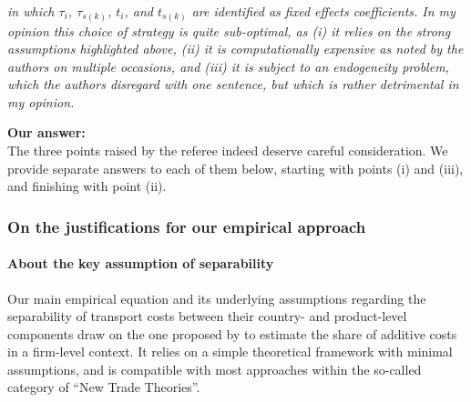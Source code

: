 \documentclass[a4paper,12pt]{article}
\begin{document}
\textit{in which $\tau_i$, $\tau_{s(k)}$, $t_i$, and $t_{s(k)}$ are identified as fixed effects coefficients.
In my opinion this choice of strategy is quite sub-optimal, as (i) it relies on
the strong assumptions highlighted above, (ii) it is computationally expensive
as noted by the authors on multiple occasions, and (iii) it is subject to an
endogeneity problem, which the authors disregard with one sentence, but which
is rather detrimental in my opinion.}

\textbf{Our answer:}\\



The three points raised by the referee indeed deserve careful consideration. We provide separate answers to each of them below, starting with points (i) and (iii), and finishing with point (ii).

\subsubsection{On the justifications for our empirical approach}

\paragraph{About the key assumption of separability}
Our main empirical equation and its underlying assumptions regarding the separability of transport costs between their country- and product-level components draw on the one proposed by \citet{Irrazabal_2015} to estimate the share of additive costs in a firm-level context. It relies on a simple theoretical framework with minimal assumptions, and is compatible with most approaches within the so-called category of ``New Trade Theories''.
\end{document}
